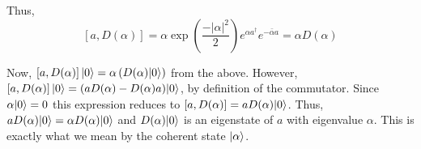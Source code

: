 \begin{homeworkProblem}
\begin{homeworkSection}{}
Thus,
\[
   [a, D(\alpha)] =
   \alpha
   \exp\left(\frac{-\left| \alpha \right|^{2}}{2}\right)
   e^{\alpha a^{\dagger}}
   e^{-\bar{\alpha}a} =
   \alpha D(\alpha)
\]

Now, $ \left[ a, D(\alpha) \right] |0\rangle = \alpha \left( D(\alpha)
|0\rangle \right) $ from the above. However, $ \left[ a, D(\alpha) \right]
|0\rangle = (a D(\alpha) - D(\alpha) a) |0\rangle$, by definition of the
commutator. Since $ \alpha |0\rangle = 0 $ this expression reduces to $ \left[
a, D(\alpha) \right] = a D(\alpha) |0\rangle $. Thus, $ a D(\alpha) |0\rangle =
\alpha D(\alpha) |0\rangle $ and $ D(\alpha) |0\rangle $ is an eigenstate of $ a $
with eigenvalue $ \alpha $. This is exactly what we mean by the coherent state $
|\alpha\rangle $.
\end{homeworkSection}
\end{homeworkProblem}
